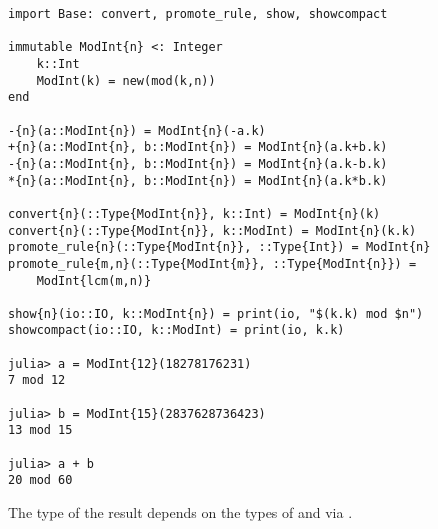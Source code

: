 \begin{verbatim}
import Base: convert, promote_rule, show, showcompact

immutable ModInt{n} <: Integer
    k::Int
    ModInt(k) = new(mod(k,n))
end

-{n}(a::ModInt{n}) = ModInt{n}(-a.k)
+{n}(a::ModInt{n}, b::ModInt{n}) = ModInt{n}(a.k+b.k)
-{n}(a::ModInt{n}, b::ModInt{n}) = ModInt{n}(a.k-b.k)
*{n}(a::ModInt{n}, b::ModInt{n}) = ModInt{n}(a.k*b.k)

convert{n}(::Type{ModInt{n}}, k::Int) = ModInt{n}(k)
convert{n}(::Type{ModInt{n}}, k::ModInt) = ModInt{n}(k.k)
promote_rule{n}(::Type{ModInt{n}}, ::Type{Int}) = ModInt{n}
promote_rule{m,n}(::Type{ModInt{m}}, ::Type{ModInt{n}}) =
    ModInt{lcm(m,n)}

show{n}(io::IO, k::ModInt{n}) = print(io, "$(k.k) mod $n")
showcompact(io::IO, k::ModInt) = print(io, k.k)

julia> a = ModInt{12}(18278176231)
7 mod 12

julia> b = ModInt{15}(2837628736423)
13 mod 15

julia> a + b
20 mod 60
\end{verbatim}

The type of the result  depends on the types of  and  via .
